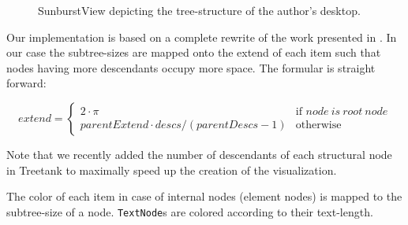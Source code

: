 \begin{itemize}
\begin{figure}[tb]
\caption{\label{fig:sunburstview} SunburstView depicting the tree-structure of the author's desktop.}
\end{figure}

Our implementation is based on a complete rewrite of the work presented in \cite{generativegest}. In our case the subtree-sizes are mapped onto the extend of each item such that nodes having more descendants occupy more space. The formular is straight forward:

\begin{equation}
extend = \left\{ \begin{array}{cl}
2 \cdot \pi & \textrm{if }node\ is\ root\ node\\
parentExtend \cdot descs / (parentDescs - 1) & \textrm{otherwise}\end{array}\right.
\end{equation}

Note that we recently added the number of descendants of each structural node in Treetank to maximally speed up the creation of the visualization. 

The color of each item in case of internal nodes (element nodes) is mapped to the subtree-size of a node. \texttt{TextNode}s are colored according to their text-length.


\end{itemize}
